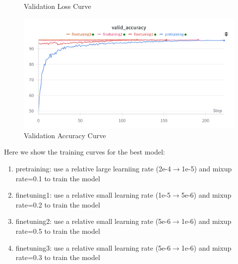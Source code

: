 \documentclass[a4 paper,12pt]{article}
\theoremstyle{definitionstyle}
\begin{document}
\begin{figure}[H]
\begin{minipage}{0.48\textwidth}
        \caption{Validation Loss Curve}
        \label{fig:valid_loss}
    \end{minipage}
    \hfill
    \begin{minipage}{0.48\textwidth}
        \centering
        \includegraphics[width=\textwidth]{valid_accuracy.png}
        \caption{Validation Accuracy Curve}
        \label{fig:valid_accuracy}
    \end{minipage}
\end{figure}  
Here we show the training curves for the best model:
\begin{enumerate}
    \item pretraining: use a relative large learniing rate (2e-4$\to$1e-5) and mixup rate=0.1 to train the model
    \item finetuning1: use a relative small learning rate (1e-5$\to$5e-6) and mixup rate=0.2 to train the model
    \item finetuning2: use a relative small learning rate (5e-6$\to$1e-6) and mixup rate=0.5 to train the model
    \item finetuning3: use a relative small learning rate (5e-6$\to$1e-6) and mixup rate=0.3 to train the model
\end{enumerate}
\end{document}
